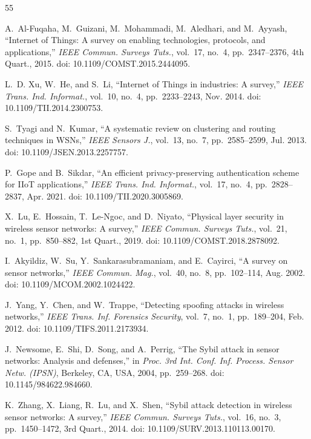 \documentclass[journal]{IEEEtran}
\begin{document}
\begin{thebibliography}{55}

A.~Al-Fuqaha, M.~Guizani, M.~Mohammadi, M.~Aledhari, and M.~Ayyash, ``Internet of Things: A survey on enabling technologies, protocols, and applications,'' \textit{IEEE Commun. Surveys Tuts.}, vol.~17, no.~4, pp.~2347--2376, 4th Quart., 2015. doi: 10.1109/COMST.2015.2444095.

L.~D. Xu, W.~He, and S.~Li, ``Internet of Things in industries: A survey,'' \textit{IEEE Trans. Ind. Informat.}, vol.~10, no.~4, pp.~2233--2243, Nov. 2014. doi: 10.1109/TII.2014.2300753.

S.~Tyagi and N.~Kumar, ``A systematic review on clustering and routing techniques in WSNs,'' \textit{IEEE Sensors J.}, vol.~13, no.~7, pp.~2585--2599, Jul. 2013. doi: 10.1109/JSEN.2013.2257757.

P.~Gope and B.~Sikdar, ``An efficient privacy-preserving authentication scheme for IIoT applications,'' \textit{IEEE Trans. Ind. Informat.}, vol.~17, no.~4, pp.~2828--2837, Apr. 2021. doi: 10.1109/TII.2020.3005869.

X.~Lu, E.~Hossain, T.~Le-Ngoc, and D.~Niyato, ``Physical layer security in wireless sensor networks: A survey,'' \textit{IEEE Commun. Surveys Tuts.}, vol.~21, no.~1, pp.~850--882, 1st Quart., 2019. doi: 10.1109/COMST.2018.2878092.

I.~Akyildiz, W.~Su, Y.~Sankarasubramaniam, and E.~Cayirci, ``A survey on sensor networks,'' \textit{IEEE Commun. Mag.}, vol.~40, no.~8, pp.~102--114, Aug. 2002. doi: 10.1109/MCOM.2002.1024422.

J.~Yang, Y.~Chen, and W.~Trappe, ``Detecting spoofing attacks in wireless networks,'' \textit{IEEE Trans. Inf. Forensics Security}, vol.~7, no.~1, pp.~189--204, Feb. 2012. doi: 10.1109/TIFS.2011.2173934.

J.~Newsome, E.~Shi, D.~Song, and A.~Perrig, ``The Sybil attack in sensor networks: Analysis and defenses,'' in \textit{Proc. 3rd Int. Conf. Inf. Process. Sensor Netw. (IPSN)}, Berkeley, CA, USA, 2004, pp.~259--268. doi: 10.1145/984622.984660.

K.~Zhang, X.~Liang, R.~Lu, and X.~Shen, ``Sybil attack detection in wireless sensor networks: A survey,'' \textit{IEEE Commun. Surveys Tuts.}, vol.~16, no.~3, pp.~1450--1472, 3rd Quart., 2014. doi: 10.1109/SURV.2013.110113.00170.


\end{thebibliography}
\end{document}
